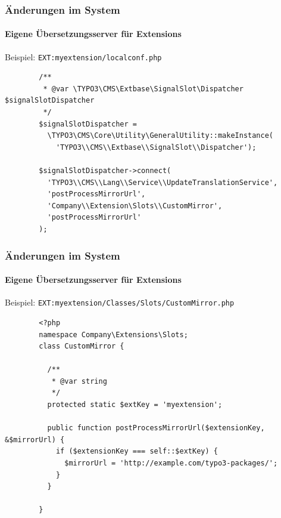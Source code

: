 
\begin{frame}[fragile]
	\frametitle{Änderungen im System}
	\framesubtitle{Eigene Übersetzungsserver für Extensions}

	Beispiel: \texttt{EXT:myextension/localconf.php}

	\lstset{
		basicstyle=\tiny\ttfamily
	}

	\begin{lstlisting}
		/**
		 * @var \TYPO3\CMS\Extbase\SignalSlot\Dispatcher $signalSlotDispatcher
		 */
		$signalSlotDispatcher =
		  \TYPO3\CMS\Core\Utility\GeneralUtility::makeInstance(
		    'TYPO3\\CMS\\Extbase\\SignalSlot\\Dispatcher');

		$signalSlotDispatcher->connect(
		  'TYPO3\\CMS\\Lang\\Service\\UpdateTranslationService',
		  'postProcessMirrorUrl',
		  'Company\\Extension\Slots\\CustomMirror',
		  'postProcessMirrorUrl'
		);
	\end{lstlisting}

\end{frame}


\begin{frame}[fragile]
	\frametitle{Änderungen im System}
	\framesubtitle{Eigene Übersetzungsserver für Extensions}

	Beispiel: \texttt{EXT:myextension/Classes/Slots/CustomMirror.php}

	\lstset{
		basicstyle=\tiny\ttfamily
	}

	\begin{lstlisting}
		<?php
		namespace Company\Extensions\Slots;
		class CustomMirror {

		  /**
		   * @var string
		   */
		  protected static $extKey = 'myextension';

		  public function postProcessMirrorUrl($extensionKey, &$mirrorUrl) {
		    if ($extensionKey === self::$extKey) {
		      $mirrorUrl = 'http://example.com/typo3-packages/';
		    }
		  }

		}
	\end{lstlisting}

\end{frame}

